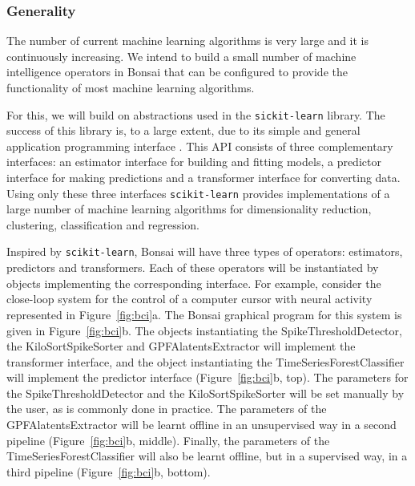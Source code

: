 \subsubsection{Generality}
\label{sec:generality}

The number of current machine learning algorithms is very large and it is
continuously increasing. We intend to build a small number of machine
intelligence operators in Bonsai that can be configured to provide the
functionality of most machine learning algorithms.

For this, we will build on abstractions used in the \texttt{sickit-learn}
library. The success of this library is, to a large extent, due to its simple
and general application programming interface \citep[API;][]{buitinckEtAl13}.
%
This API consists of three complementary interfaces: an estimator interface for
building and fitting models, a predictor interface for making predictions and a
transformer interface for converting data.
%
Using only these three interfaces \texttt{scikit-learn} provides
implementations of a large number of machine learning algorithms for
dimensionality reduction, clustering, classification and regression.

Inspired by \texttt{scikit-learn}, Bonsai will have three types of operators:
estimators, predictors and transformers. Each of these operators will be
instantiated by objects implementing the corresponding interface.
%
For example, consider the close-loop system for the control of a computer
cursor with neural activity represented in Figure~\ref{fig:bci}a. The Bonsai
graphical program for this system is given in Figure~\ref{fig:bci}b. The
objects instantiating the SpikeThresholdDetector, the KiloSortSpikeSorter and
GPFAlatentsExtractor will implement the transformer interface, and the object
instantiating the TimeSeriesForestClassifier will implement the predictor
interface (Figure~\ref{fig:bci}b, top).
%
The parameters for the SpikeThresholdDetector and the KiloSortSpikeSorter will
be set manually by the user, as is commonly done in practice. The parameters of
the GPFAlatentsExtractor will be learnt offline in an unsupervised way in a
second pipeline (Figure~\ref{fig:bci}b, middle). Finally, the parameters of the
TimeSeriesForestClassifier will also be learnt offline, but in a supervised
way, in a third pipeline (Figure~\ref{fig:bci}b, bottom).

